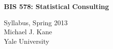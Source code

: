 \documentclass[12pt]{article}
\begin{document}



\begin{center}


{\Large\bf BIS 578: Statistical Consulting\\
\vspace*{0.5cm}

Syllabus, Spring 2013\\
\vspace*{0.5cm}
Michael J. Kane\\
Yale University

}


\vspace*{1cm}


\end{center}
\end{document}
